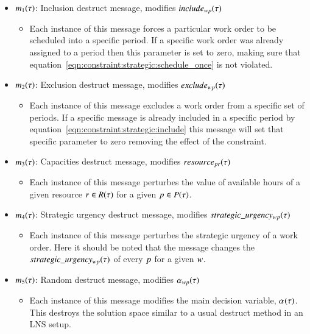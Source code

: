 \begin{itemize}
	\item $m_1(\tau)$: Inclusion destruct message, modifies $include_{wp}(\tau)$	
	\begin{itemize}
		\item Each instance of this message forces a particular work order to be scheduled into
			a specific period. If a specific work order was already assigned to a period then this 
			parameter is set to zero, making sure that equation~\ref{eqn:constraint:strategic:schedule_once}
			is not violated.
	\end{itemize}
	\item $m_2(\tau)$: Exclusion destruct message, modifies $exclude_{wp}(\tau)$
	\begin{itemize}
		\item Each instance of this message excludes a work order from a specific set of periods.
			If a specific message is already included in a specific period by equation~\ref{eqn:constraint:strategic:include}
			this message will set that specific parameter to zero removing the effect of the constraint. 
	\end{itemize}
	\item $m_3(\tau)$: Capacities destruct message, modifies $\ParStrategicResource$
	\begin{itemize}
		\item Each instance of this message perturbes the value of available hours of a given resource $r \in R(\tau)$ for
			a given $p \in P(\tau)$.
	\end{itemize}
	\item $m_4(\tau)$: Strategic urgency destruct message, modifies $strategic\_urgency_{w p}(\tau)$
	\begin{itemize}
		\item Each instance of this message perturbes the strategic urgency of a work order. Here it should be noted that the
			message changes the $strategic\_urgency_{w p}(\tau)$ of every $p$ for a given $w$. 
	\end{itemize}
	\item $m_5(\tau)$: Random destruct message, modifies $\alpha_{wp}(\tau)$
	\begin{itemize}
		\item Each instance of this message modifies the main decision variable, $\alpha_{}(\tau)$. This destroys the 
			solution space similar to a usual destruct method in an LNS setup.
	\end{itemize}
\end{itemize}


